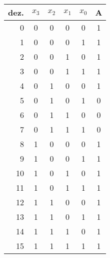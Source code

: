 \documentclass[10pt,a4paper,oneside,ngerman,numbers=noenddot]{scrartcl}
\begin{document}
\subsection{} %
\begin{tabular}{r|ccccc}
dez.& $x_{3}$	& $x_{2}$	& $x_{1}$	& $x_{0}$	& A \\
\hline
0	& 0 		& 0			& 0			& 0		  	& 1 \\
1	& 0			& 0			& 0			& 1		  	& 1 \\
2	& 0			& 0			& 1			& 0			& 1 \\
3	& 0			& 0			& 1			& 1			& 1 \\
4	& 0			& 1			& 0			& 0			& 1 \\
5	& 0			& 1			& 0 		& 1			& 0 \\
6	& 0			& 1			& 1			& 0			& 0 \\
7	& 0			& 1			& 1			& 1			& 0 \\
8	& 1			& 0			& 0			& 0			& 1 \\
9	& 1			& 0			& 0			& 1			& 1 \\
10	& 1			& 0			& 1			& 0			& 1 \\
11	& 1			& 0			& 1 		& 1			& 1 \\
12	& 1			& 1			& 0			& 0			& 1 \\
13 	& 1			& 1			& 0			& 1			& 1 \\
14	& 1			& 1			& 1			& 0			& 1 \\
15	& 1			& 1			& 1			& 1			& 1
\end{tabular}
\end{document}
